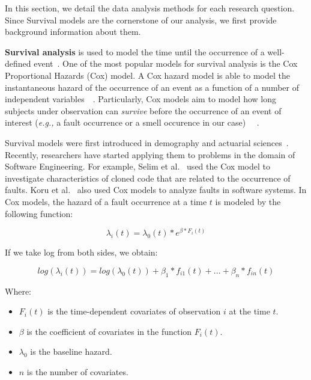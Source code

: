 \documentclass[smallcondensed]{svjour3}
\newcommand{\eg}{{\textit{e.g.,}}}
\begin{document}
{\color{blue}In this section, we detail the data analysis methods for each research question. Since Survival models are the cornerstone of our analysis, we first provide background information about them. %
	
\textbf{Survival analysis} is used to model the time until the occurrence of a well-defined event~\cite{fox2010r}. One of the most popular models for survival analysis is the Cox Proportional Hazards (Cox) model. A Cox hazard model is able to model the instantaneous hazard of the occurrence of an event as a function of a number of independent variables~\cite{koru2008theory}~\cite{singer2003applied}. Particularly, Cox models aim to model how long subjects under observation can \textsl{survive} before the occurrence of an event of interest (\eg{} a fault occurrence or a smell occurence in our case) ~\cite{singer2003applied}~\cite{selim2010studying}.
	
Survival models were first introduced in demography and actuarial sciences~\cite{Westergaard}. Recently, researchers have started applying them to problems in the domain of Software Engineering. For example, Selim et al.~\cite{selim2010studying} used the Cox model to investigate characteristics of cloned code that are related to the occurrence of faults. Koru et al.~\cite{koru2007modeling} also used Cox models to analyze faults in software systems. %
In Cox models, the hazard of a fault occurrence at a time $t$ is modeled by the following function:
	
\begin{equation}\label{eq1}
\lambda_{i}(t) = \lambda_{0}(t)* e ^ {\beta*{F_{i}}(t)}
\end{equation}
	
If we take log from both sides, we obtain:
	
\begin{equation}\label{eq2}
log(\lambda_{i}(t)) = log(\lambda_{0}(t)) + {\beta_{1}*{f_{i1}}(t)} + ... + {\beta_{n}*{f_{in}}(t)}
\end{equation}
	
Where:
\begin{itemize}
	\item ${F_{i}}(t)$ is the time-dependent covariates of observation $i$ at the time $t$.
	\item $\beta$ is the coefficient of covariates in the function ${F_{i}}(t)$.	
	\item $\lambda_0$ is the baseline hazard.
	\item $n$ is the number of covariates.
\end{itemize}
	
}
\end{document}
